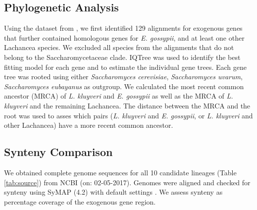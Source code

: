 \documentclass[doublespacing,linenumbers]{bmcart-modified}
\newcommand{\kluyveri}{\textit{L. kluyveri}\xspace}
\newcommand{\gossypii}{\textit{E. gossypii}\xspace}
\begin{document}
\subsection*{Phylogenetic Analysis}
Using the dataset from \cite{shen2018}, we first identified 129 alignments for exogenous genes that further contained homologous genes for \gossypii, and at least one other Lachancea species.
We excluded all species from the alignments that do not belong to the Saccharomycetaceae clade. 
IQTree \citep{nguyen2015} was used to identify the best fitting model for each gene and to estimate the individual gene trees.
Each gene tree was rooted using either \textit{Saccharomyces cerevisiae}, \textit{Saccharomyces uvarum}, \textit{Saccharomyces eubayanus} as outgroup.
We calculated the most recent common ancestor (MRCA) of \kluyveri and \gossypii as well as the MRCA of \kluyveri and the remaining Lachancea.
The distance between the MRCA and the root was used to asses which pairs (\kluyveri and \gossypii, or \kluyveri and other Lachancea) have a more recent common ancestor.

\subsection*{Synteny Comparison}
We obtained complete genome sequences for all 10 candidate lineages (Table \ref{tab:source}) from NCBI (on: 02-05-2017).
Genomes were aligned and checked for synteny using SyMAP (4.2) with default settings \citep{soderlund2006, soderlund2011}.
We assess synteny as percentage coverage of the exogenous gene region.
\end{document}
